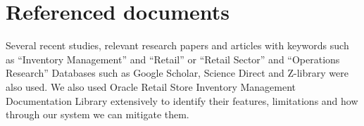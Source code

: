 \chapter{Referenced documents \\ 
\label{Chapter::Referenceddocuments}} 

Several recent studies, relevant research papers and articles with keywords such as “Inventory Management” and “Retail” or “Retail Sector” and “Operations Research” Databases such as Google Scholar, Science Direct and Z-library were also used. We also used Oracle Retail Store Inventory Management Documentation Library extensively to identify their features, limitations and how through our system we can mitigate them.\cite{ORACLE}

\newpage